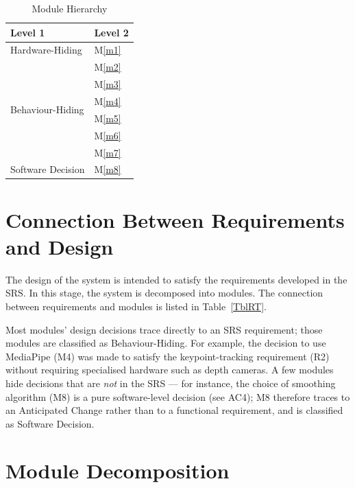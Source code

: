 \documentclass[12pt, titlepage]{article}
\newcommand{\mref}[1]{M\ref{#1}}
\begin{document}
\begin{table}[h!]
\centering
\begin{tabular}{p{} p{}}
\toprule
\textbf{Level 1} & \textbf{Level 2}\\
\midrule

\multirow{1}{0.3\textwidth}{Hardware-Hiding} & \mref{m1}\\
\midrule

\multirow{6}{0.3\textwidth}{Behaviour-Hiding} & \mref{m2}\\
& \mref{m3}\\
& \mref{m4}\\
& \mref{m5}\\
& \mref{m6}\\
& \mref{m7}\\
\midrule

\multirow{1}{0.3\textwidth}{Software Decision} & \mref{m8} \\
\bottomrule

\end{tabular}
\caption{Module Hierarchy}
\label{TblMH}
\end{table}

\section{Connection Between Requirements and Design} \label{SecConnection}

The design of the system is intended to satisfy the requirements developed in
the SRS. In this stage, the system is decomposed into modules. The connection
between requirements and modules is listed in Table~\ref{TblRT}.

Most modules' design decisions trace directly to an SRS requirement; those
modules are classified as Behaviour-Hiding. For example, the decision to use
MediaPipe (M4) was made to satisfy the keypoint-tracking requirement (R2)
without requiring specialised hardware such as depth cameras. A few modules
hide decisions that are \emph{not} in the SRS --- for instance, the choice of
smoothing algorithm (M8) is a pure software-level decision (see AC4);
M8 therefore traces to an Anticipated Change rather than to a functional
requirement, and is classified as Software Decision.

\section{Module Decomposition} \label{SecMD}
\end{document}
